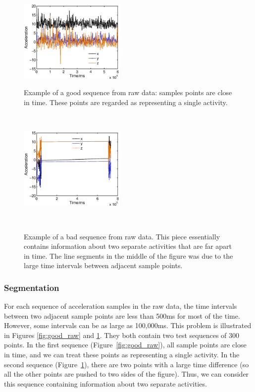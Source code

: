 \documentclass{article} %
\begin{document}
\begin{figure}
    \hspace{-0.5cm}
    \begin{minipage}[t]{0.02\textwidth}~
    \end{minipage}
    \begin{minipage}[t]{0.47\textwidth}
    \centering
    \includegraphics[height=40mm]{fig/good_raw.eps}
    \caption{Example of a good sequence from raw data: samples points are close in time. These points are regarded as representing a single activity.}
    \label{fig:good_raw}
    \end{minipage}
    \begin{minipage}[t]{0.02\textwidth}~
    \end{minipage}
    \begin{minipage}[t]{0.47\textwidth}
    \centering
    \includegraphics[height=40mm]{fig/bad_raw.eps}\\
    \caption{Example of a bad sequence from raw data. This piece essentially contains information about two separate activities that are far apart in time. The line segments in the middle of the figure was due to the large time intervals between adjacent sample points.}
    \label{fig:bad_raw}
    \end{minipage}
    \begin{minipage}[t]{0.02\textwidth}~
    \end{minipage}%
 \end{figure}


\subsubsection{Segmentation} %
For each sequence of acceleration samples in the raw data, the time intervals between two adjacent sample points are less than 500ms for most of the time. However, some intervals can be as large as 100,000ms. This problem is illustrated in Figures \ref{fig:good_raw} and \ref{fig:bad_raw}. They both contain two test sequences of 300 points. In the first sequence (Figure~\ref{fig:good_raw}), all sample points are close in time, and we can treat these points as representing a single activity. In the second sequence (Figure~\ref{fig:bad_raw}), there are two points with a large time difference (so all the other points are pushed to two sides of the figure). Thus, we can consider this sequence containing information about two separate activities. 
\end{document}
